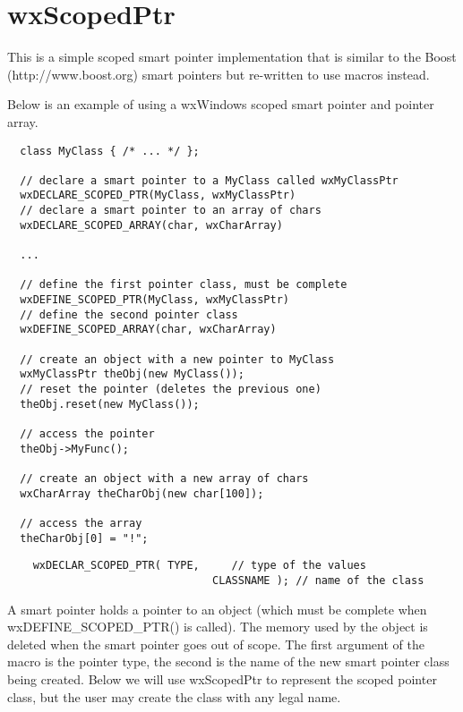 \section{wxScopedPtr}\label{wxscopedptr}

This is a simple scoped smart pointer implementation that is similar to 
the Boost (http://www.boost.org) smart pointers but re-written to
use macros instead.


Below is an example of using a wxWindows scoped smart pointer and 
pointer array.

\begin{verbatim}
  class MyClass { /* ... */ };

  // declare a smart pointer to a MyClass called wxMyClassPtr
  wxDECLARE_SCOPED_PTR(MyClass, wxMyClassPtr)
  // declare a smart pointer to an array of chars
  wxDECLARE_SCOPED_ARRAY(char, wxCharArray)

  ...

  // define the first pointer class, must be complete
  wxDEFINE_SCOPED_PTR(MyClass, wxMyClassPtr)
  // define the second pointer class
  wxDEFINE_SCOPED_ARRAY(char, wxCharArray)

  // create an object with a new pointer to MyClass
  wxMyClassPtr theObj(new MyClass());
  // reset the pointer (deletes the previous one)
  theObj.reset(new MyClass());

  // access the pointer
  theObj->MyFunc();

  // create an object with a new array of chars
  wxCharArray theCharObj(new char[100]);

  // access the array
  theCharObj[0] = "!";
\end{verbatim}


\begin{verbatim}
    wxDECLAR_SCOPED_PTR( TYPE,     // type of the values
                                CLASSNAME ); // name of the class
\end{verbatim}

A smart pointer holds a pointer to an object (which must be complete
when wxDEFINE_SCOPED_PTR() is called). The memory used by the object is
deleted when the smart pointer goes out of scope. The first argument
of the macro is the pointer type, the second is the name of the new
smart pointer class being created.  Below we will use wxScopedPtr to
represent the scoped pointer class, but the user may create the class with any
legal name.

